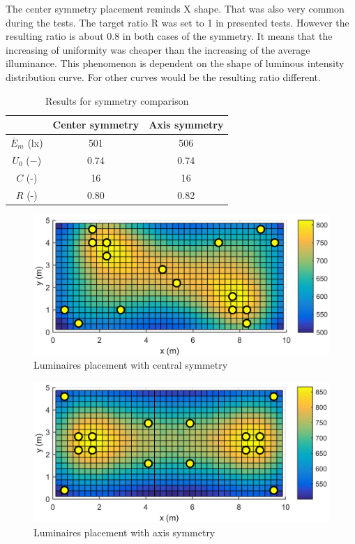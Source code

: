 The center symmetry placement reminds X shape. That was also very common during the tests. The target ratio R was set to 1 in presented tests. However the resulting ratio is about 0.8 in both cases of the symmetry. It means that the increasing of uniformity was cheaper than the increasing of the average illuminance. This phenomenon is dependent on the shape of luminous intensity distribution curve. For other curves would be the resulting ratio different.

\begin{table}[tb]
	\renewcommand{\arraystretch}{1.8}
	\caption{Results for symmetry comparison}
 	\label{tab:symmetry}
	\centering
  \begin{tabular}{| c | c | c |}
    \hline
    & \textbf{Center symmetry} & \textbf{Axis symmetry} \\
    \hline
    $\overline{E}_{m}$ (lx) & 501 & 506 \\
    \hline
		$U_0$ ($-$)& 0.74 & 0.74 \\
    \hline
		$C$ (-) & 16 & 16 \\
	\hline
		$R$ (-) & 0.80 & 0.82 \\
  \hline
  \end{tabular}
\end{table}

\begin{figure}[tb]
  \centering
  \includegraphics[width=\columnwidth]{MSTR_SLB_4x18W_5G4_Fit2_V010_S0}
  \caption{Luminaires placement with central symmetry}
  \label{fig:V010_S0}
\end{figure}

\begin{figure}[tb]
  \centering
  \includegraphics[width=\columnwidth]{../Vysledky/MSTR_SLB_4x18W_5G4_Fit2_V010_S1}
  \caption{Luminaires placement with axis symmetry}
  \label{fig:V010_S1}
\end{figure}

